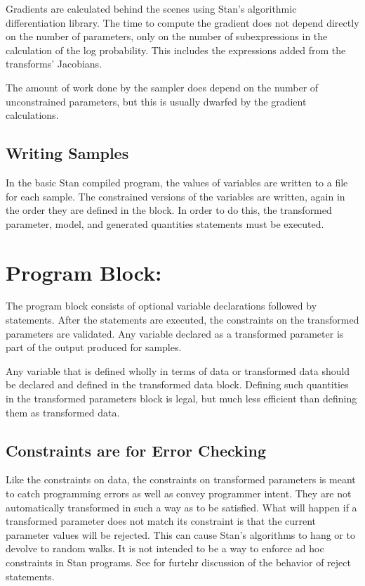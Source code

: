 Gradients are calculated behind the scenes using Stan's algorithmic
differentiation library.  The time to compute the gradient does not
depend directly on the number of parameters, only on the number of
subexpressions in the calculation of the log probability.  This
includes the expressions added from the transforms' Jacobians.

The amount of work done by the sampler does depend on the number of
unconstrained parameters, but this is usually dwarfed by the gradient
calculations.

\subsection{Writing Samples}

In the basic Stan compiled program, the values of variables are
written to a file for each sample.  The constrained versions of the
variables are written, again in the order they are defined in the
 block.  In order to do this, the transformed
parameter, model, and generated quantities statements must be
executed.


\section{Program Block: }

The  program block consists of optional
variable declarations followed by statements.  After the statements
are executed, the constraints on the transformed parameters are
validated.  Any variable declared as a transformed parameter is part
of the output produced for samples.

Any variable that is defined wholly in terms of data or transformed
data should be declared and defined in the transformed data block.
Defining such quantities in the transformed parameters block is legal,
but much less efficient than defining them as transformed data.

\subsection{Constraints are for Error Checking}

Like the constraints on data, the constraints on transformed
parameters is meant to catch programming errors as well as convey
programmer intent.  They are not automatically transformed in such a
way as to be satisfied.  What will happen if a transformed parameter
does not match its constraint is that the current parameter values
will be rejected.  This can cause Stan's algorithms to hang or
to devolve to random walks.  It is not intended to be a way to enforce
ad hoc constraints in Stan programs.   See 
for furtehr discussion of the behavior of reject statements.



